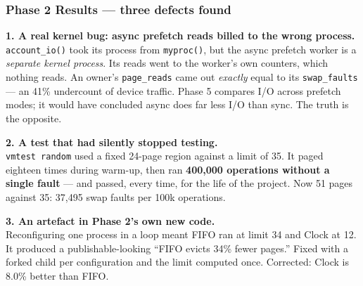 \documentclass[10pt,aspectratio=169]{beamer}
\newcommand{\good}[1]{\textcolor{good}{#1}}
\newcommand{\phasehead}[2]{%
  \frametitle{#1 \quad\small\normalfont\textcolor{white!75!accent}{#2}}}
\begin{document}
\begin{frame}
  \phasehead{Phase 2}{Results --- three defects found}
  \small
  \textbf{1. A real kernel bug: async prefetch reads billed to the wrong
  process.}\\
  \texttt{account\_io()} took its process from \texttt{myproc()}, but the async
  prefetch worker is a \emph{separate kernel process}. Its reads went to the
  worker's own counters, which nothing reads. An owner's \texttt{page\_reads}
  came out \emph{exactly} equal to its \texttt{swap\_faults} --- an
  \alert{41\% undercount of device traffic}. Phase 5 compares I/O across
  prefetch modes; it would have concluded async does far less I/O than sync.
  The truth is the opposite.

  \medskip
  \textbf{2. A test that had silently stopped testing.}\\
  \texttt{vmtest random} used a fixed 24-page region against a limit of 35. It
  paged eighteen times during warm-up, then ran \textbf{400{,}000 operations
  without a single fault} --- and passed, every time, for the life of the
  project. Now 51 pages against 35: \good{37{,}495 swap faults per 100k
  operations}.

  \medskip
  \textbf{3. An artefact in Phase 2's own new code.}\\
  Reconfiguring one process in a loop meant FIFO ran at limit 34 and Clock at
  12. It produced a \alert{publishable-looking ``FIFO evicts 34\% fewer
  pages.''} Fixed with a forked child per configuration and the limit computed
  once. Corrected: Clock is \good{8.0\%} better than FIFO.
\end{frame}
\end{document}
